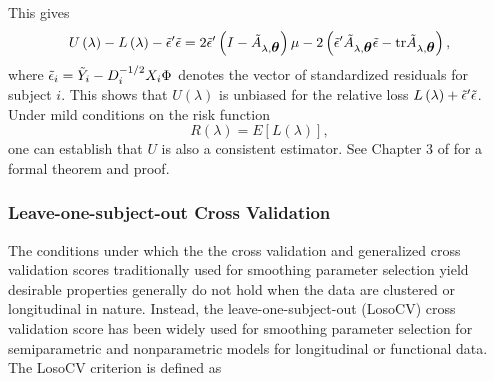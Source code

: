 \noindent
This gives
\begin{equation*} 
U\left(\lambda\right) - L\left(\lambda\right) - \tilde{\epsilon}'\tilde{\epsilon}  =  2\tilde{\epsilon}' \left( I- \tilde{A}_{\lambda,\mbox{\boldmath $\theta$}}\right)\mu- 2\left( \tilde{\epsilon}'\tilde{A}_{\lambda,\mbox{\boldmath $\theta$}} \tilde{\epsilon} -  \mbox{tr}\tilde{A}_{\lambda,\mbox{\boldmath $\theta$}}\right), 
\end{equation*}
 \noindent
where $\tilde{\epsilon}_i = \tilde{Y}_i - D_i^{-1/2}X_i \Phi$ denotes the vector of standardized residuals for subject $i$. This shows that $U\left(\lambda\right)$ is unbiased for the relative loss $L\left(\lambda\right) + \tilde{\epsilon}'\tilde{\epsilon}$.  Under mild conditions on the risk function
  \[
 R\left(\lambda\right) = E\left[L\left(\lambda\right)\right],
 \]
\noindent
one can establish that $U$ is also a consistent estimator. See Chapter 3 of \cite{gu2013smoothing} for a formal theorem and proof.


\subsubsection{Leave-one-subject-out Cross Validation}  
The conditions under which the the cross validation and generalized cross validation scores traditionally used for smoothing parameter selection yield desirable properties generally do not hold when the data are clustered or longitudinal in nature. Instead, the leave-one-subject-out (LosoCV) cross validation score has been widely used for smoothing parameter selection for semiparametric and nonparametric models for longitudinal or functional data. The LosoCV criterion is defined as

